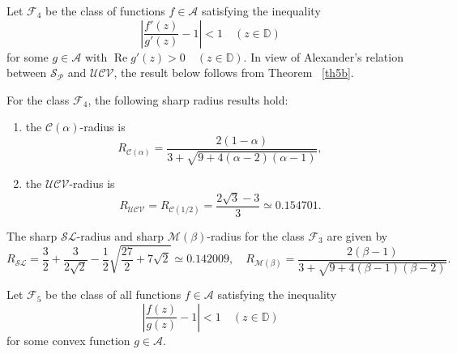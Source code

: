 \documentclass{amsart}
\begin{document}
Let $\mathcal{F}_4$ be the class of functions $f\in \mathcal{A}$ satisfying the inequality
\[   \left|\frac{f'(z)}{g'(z)}-1\right|<1\quad ( z\in \mathbb{D})\]
for some  $g\in \mathcal{A}$ with
   $\operatorname{Re} g'(z)>0\quad ( z\in \mathbb{D}).$ In view of Alexander's relation between ${\mathcal{S}_{\mathcal{P}}}$ and ${\mathcal{UCV}}$,   the result below  follows from Theorem ~\ref{th5b}.

\begin{theorem}\label{thm4}
 
For the class $\mathcal{F}_4$,    the following sharp radius results hold:
\begin{enumerate}
\item\label{i25}  the ${\mathcal{C}(\alpha)}$-radius  is
\[R_{\mathcal{C}(\alpha)}=\frac{2(1-\alpha)}{3+\sqrt{9+4(\alpha-2)(\alpha-1)}},\]
\item\label{i26}   the ${\mathcal{UCV}}$-radius  is
\[R_{\mathcal{UCV}}= R_{\mathcal{C}( 1/2)}= \frac{2\sqrt{3}-3}{3} \simeq0.154701.\]
\end{enumerate}
\end{theorem}

\begin{conjecture}
  The sharp $ {\mathcal{SL}}$-radius and sharp ${\mathcal{M}(\beta)}$-radius for the class $\mathcal{F}_3$ are given by
\[R_{\mathcal{SL}}=\frac{3}{2}+\frac{3}{2 \sqrt{2}}-\frac{1}{2} \sqrt{\frac{27}{2}+7 \sqrt{2}}\simeq0.142009, \quad
R_{\mathcal{M}(\beta)}=\frac{2(\beta -1)}{3+\sqrt{9+4(\beta -1)(\beta -2)}}.\]

\end{conjecture}

Let $\mathcal{F}_5$ be the class of all functions $f\in \mathcal{A}$ satisfying the inequality
\[   \left|\frac{f(z)}{g(z)}-1\right|<1\quad ( z\in \mathbb{D})\]
for some   convex function $g\in \mathcal{A}$.
\end{document}
